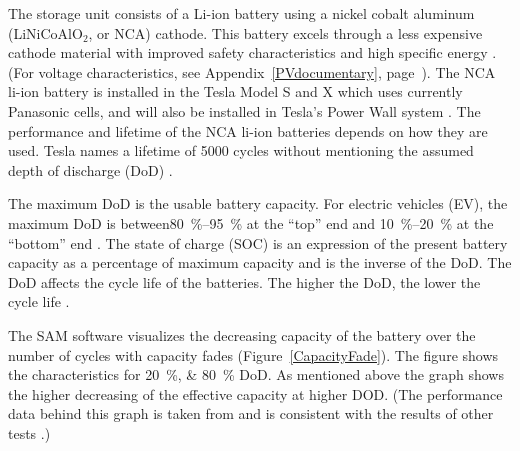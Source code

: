 The storage unit consists of a Li-ion battery using a nickel cobalt aluminum (LiNiCoAlO$_2$,  or NCA) cathode. This battery excels through a less expensive cathode material with improved safety characteristics and high specific energy \cite{NREL2015a}. (For voltage characteristics, see Appendix~\ref{PVdocumentary}, page~\pageref{EES_VoltageDischarge}). The NCA li-ion battery is installed in the Tesla Model S and X \cite{Nykvist2015} which uses currently Panasonic cells, and will also be installed in Tesla's Power Wall system \cite{Shahan2015}. The performance and lifetime of the NCA li-ion batteries depends on how they are used. Tesla names a lifetime of \num{5000} cycles without mentioning the assumed depth of discharge (DoD) \cite{Shahan2015}.



The maximum DoD is the usable battery capacity. For electric vehicles (EV), the maximum DoD is between\SIrange{80}{95}{\percent} at the \enquote{top} end and \SIrange{10}{20}{\percent} at the \enquote{bottom} end \cite{Warner2014}. The state of charge (SOC) is an expression of the present battery capacity as a percentage of maximum capacity and is the inverse of the DoD. The DoD affects the cycle life of the batteries. The higher the DoD, the lower the cycle life \cite{MitElectricVehilceTeam2008}.


The SAM software visualizes the decreasing capacity of the battery over the number of cycles with capacity fades (Figure~\ref{CapacityFade}). The figure shows the characteristics for \SIlist{20;80}{\percent} DoD. As mentioned above the graph shows the higher decreasing of the effective capacity at higher DOD. (The performance data behind this graph is taken from \cite{Dahn2011} and is consistent with the results of other tests \cite{Read2009}.)

